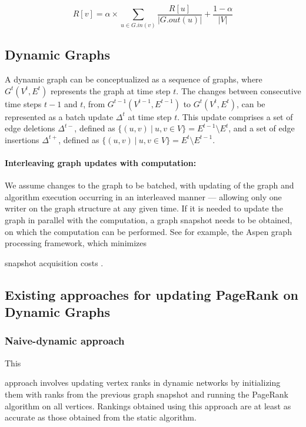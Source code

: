 \begin{equation}
\label{eq:pr}
    R[v] = \alpha \times \sum_{u \in G.in(v)} \frac{R[u]}{|G.out(u)|} + \frac{1 - \alpha}{|V|}
\end{equation}




\subsection{Dynamic Graphs}
\label{sec:about-dynamic}

A dynamic graph can be conceptualized as a sequence of graphs, where $G^t(V^t, E^t)$ represents the graph at time step $t$. The changes between consecutive time steps $t-1$ and $t$, from $G^{t-1}(V^{t-1}, E^{t-1})$ to $G^t(V^t, E^t)$, can be represented as a batch update $\Delta^t$ at time step $t$. This update comprises a set of edge deletions $\Delta^{t-}$, defined as $\{(u, v)\ |\ u, v \in V\} = E^{t-1} \setminus E^t$, and a set of edge insertions $\Delta^{t+}$, defined as $\{(u, v)\ |\ u, v \in V\} = E^t \setminus E^{t-1}$.


\paragraph{Interleaving graph updates with computation:}

We assume changes to the graph to be batched, with updating of the graph and algorithm execution occurring in an interleaved manner --- allowing only one writer on the graph structure at any given time. If it is needed to update the graph in parallel with the computation, a graph snapshot needs to be obtained, on which the computation can be performed. See for example, the Aspen graph processing framework, which minimizes snapshot acquisition costs \cite{graph-dhulipala19}.




\subsection{Existing approaches for updating PageRank on Dynamic Graphs}

\subsubsection{Naive-dynamic approach}
\label{sec:about-naive}

This approach involves updating vertex ranks in dynamic networks by initializing them with ranks from the previous graph snapshot and running the PageRank algorithm on all vertices. Rankings obtained using this approach are at least as accurate as those obtained from the static algorithm.



